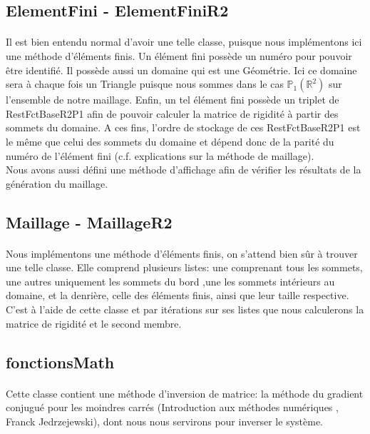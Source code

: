 \subsection{ElementFini - ElementFiniR2 }
\paragraph{} Il est bien entendu normal d'avoir une telle classe, puisque nous implémentons ici une méthode d'éléments finis. Un élément fini possède un numéro pour pouvoir être identifié. Il possède aussi un domaine qui est une Géométrie. Ici ce domaine sera à chaque fois un Triangle puisque nous sommes dans le cas $\mathbb{P}_1(\mathbb{R}^2)$ sur l'ensemble de notre maillage. Enfin, un tel élément fini possède un triplet de RestFctBaseR2P1 afin de pouvoir calculer la matrice de rigidité à partir des sommets du domaine. A ces fins, l'ordre de stockage de ces RestFctBaseR2P1 est le même que celui des sommets du domaine et dépend donc de la parité du numéro de l'élément fini (c.f. explications sur la méthode de maillage).\\

Nous avons aussi défini une méthode d'affichage afin de vérifier les résultats de la génération du maillage.\\

\subsection{Maillage - MaillageR2}
\paragraph{} Nous implémentons une méthode d'éléments finis, on s'attend bien sûr à trouver une telle classe. Elle comprend plusieurs listes: une comprenant tous les sommets, une autres uniquement les sommets du bord ,une  les sommets intérieurs au domaine, et la denrière, celle des éléments finis, ainsi que leur taille respective.\\

C'est à l'aide de cette classe et par itérations sur ses listes que nous calculerons la matrice de rigidité et le second membre.\\ 

\subsection{fonctionsMath}
\paragraph{}Cette classe contient une méthode d'inversion de matrice: la méthode du gradient conjugué pour les moindres carrés (Introduction aux méthodes numériques , Franck Jedrzejewski), dont nous nous servirons pour inverser le système.

